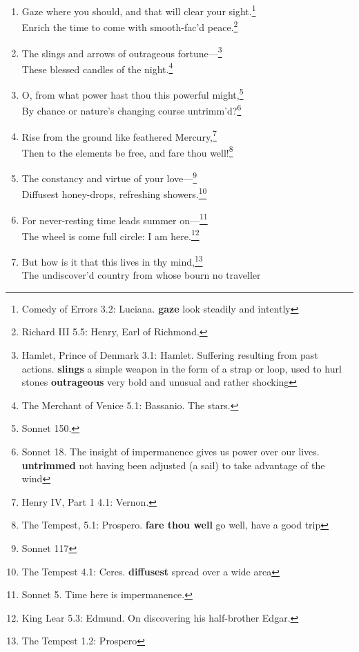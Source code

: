 \documentclass[17pt,twoside]{extarticle}
\begin{document}
\begin{enumerate}
  \footnote{Hamlet, Prince of Denmark 2.2: Hamlet. He speaks of man.
    \textbf{apprehension} understanding}\\That the rude sea grew civil
  at her song.\footnote{A Midsummer Night's Dream 2.1: Oberon. Of a
    mermaid on a dolphin's back. \textbf{rude} rough, choppy
    \textbf{civil} calm}
\item
  Gaze where you should, and that will clear your sight.\footnote{Comedy
    of Errors 3.2: Luciana. \textbf{gaze} look steadily and intently}\\Enrich
  the time to come with smooth-fac'd peace.\footnote{Richard III 5.5:
    Henry, Earl of Richmond.}
\item
  The slings and arrows of outrageous fortune---\footnote{Hamlet, Prince
    of Denmark 3.1: Hamlet. Suffering resulting from past actions.
    \textbf{slings} a simple weapon in the form of a strap or loop, used
    to hurl stones \textbf{outrageous} very bold and unusual and rather
    shocking}\\These blessed candles of the night.\footnote{The Merchant
    of Venice 5.1: Bassanio. The stars.}
\item
  O, from what power hast thou this powerful might,\footnote{Sonnet 150.}\\By
  chance or nature's changing course untrimm'd?\footnote{Sonnet 18. The
    insight of impermanence gives us power over our lives.
    \textbf{untrimmed} not having been adjusted (a sail) to take
    advantage of the wind}
\item
  Rise from the ground like feathered Mercury,\footnote{Henry IV, Part 1
    4.1: Vernon.}\\Then to the elements be free, and fare thou
  well!\footnote{The Tempest, 5.1: Prospero. \textbf{fare thou well} go
    well, have a good trip}
\item
  The constancy and virtue of your love---\footnote{Sonnet 117}\\Diffusest
  honey-drops, refreshing showers.\footnote{The Tempest 4.1: Ceres.
    \textbf{diffusest} spread over a wide area}
\item
  For never-resting time leads summer on---\footnote{Sonnet 5. Time here
    is impermanence.}\\The wheel is come full circle: I am
  here.\footnote{King Lear 5.3: Edmund. On discovering his half-brother
    Edgar.}
\item
  But how is it that this lives in thy mind,\footnote{The Tempest 1.2:
    Prospero}\\The undiscover'd country from whose bourn no traveller

\end{enumerate}
\end{document}
